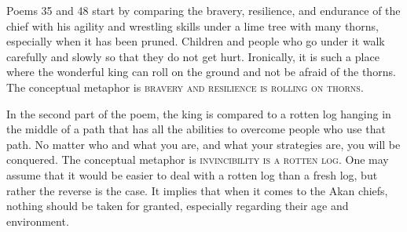 \documentclass[output=paper,colorlinks,citecolor=brown]{langscibook}
\begin{document}
\begin{table}
\small
\caption{Poem 48 and Poem 71 (\cite[19, 27--28]{Nketia1978})}
\label{tab:Poem4871}
\end{table}

Poems 35 and 48 start by comparing the bravery, resilience, and endurance of the chief with his agility and wrestling skills under a lime tree with many thorns,
especially when it has been pruned. Children and people who go under it walk carefully and slowly so that they do not get hurt. Ironically, it is such a place where the wonderful king can roll on the ground and not be afraid of the thorns. The conceptual metaphor is \textsc{bravery and resilience is rolling on thorns}.

In the second part of the poem, the king is compared to a rotten log hanging in the middle of a path that has all the abilities to overcome people who use that path. No matter who and what you are, and what your strategies are, you will be conquered. The conceptual metaphor is \textsc{invincibility is a rotten log}. One may assume that it would be easier to deal with a rotten log than a fresh log, but rather the reverse is the case. It implies that when it comes to the Akan chiefs, nothing should be taken for granted, especially regarding their age and environment.
\end{document}
